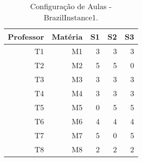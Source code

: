 \begin{table}[h]
	\centering
	\caption[Configuração de Aulas - BrazilInstance1]{Configuração de Aulas - BrazilInstance1.
		\label{tab:config_aulas_br1}}
	\begin{tabular}{rrrrr}
		\toprule
		Professor & Matéria & S1 & S2 & S3 \\
		\midrule
		T1 & M1 & 3 & 3 & 3 \\
		T2 & M2 & 5 & 5 & 0 \\
		T3 & M3 & 3 & 3 & 3 \\
		T4 & M4 & 3 & 3 & 3 \\
		T5 & M5 & 0 & 5 & 5 \\
		T6 & M6 & 4 & 4 & 4 \\
		T7 & M7 & 5 & 0 & 5 \\
		T8 & M8 & 2 & 2 & 2 \\
		\bottomrule
	\end{tabular}
\end{table}

